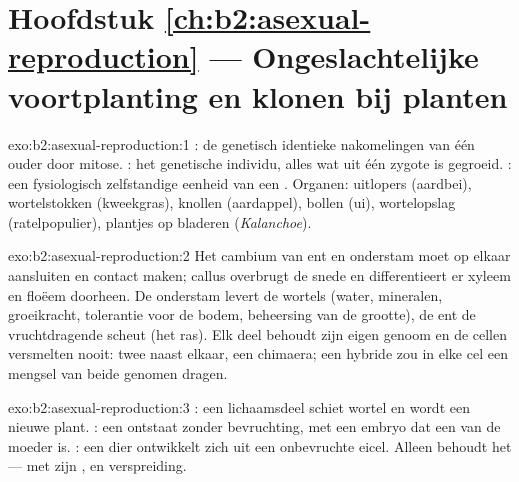 \section*{Hoofdstuk \ref{ch:b2:asexual-reproduction} --- Ongeslachtelijke voortplanting en klonen bij planten}

\begin{solution}{exo:b2:asexual-reproduction:1}
: de genetisch identieke nakomelingen van één ouder door mitose.
: het genetische individu, alles wat uit één zygote is gegroeid.
: een fysiologisch zelfstandige eenheid van een . Organen:
uitlopers (aardbei), wortelstokken (kweekgras), knollen (aardappel), bollen
(ui), wortelopslag (ratelpopulier), plantjes op bladeren
(\emph{Kalanchoe}).
\end{solution}

\begin{solution}{exo:b2:asexual-reproduction:2}
Het cambium van ent en onderstam moet op elkaar aansluiten en contact
maken; callus overbrugt de snede en differentieert er xyleem en floëem
doorheen. De onderstam levert de wortels (water, mineralen, groeikracht,
tolerantie voor de bodem, beheersing van de grootte), de ent de
vruchtdragende scheut (het ras). Elk deel behoudt zijn eigen genoom en de
cellen versmelten nooit: twee  naast elkaar, een chimaera; een
hybride zou in elke cel een mengsel van beide genomen dragen.
\end{solution}

\begin{solution}{exo:b2:asexual-reproduction:3}
: een lichaamsdeel schiet wortel en wordt een
nieuwe plant. : een  ontstaat zonder bevruchting, met een
embryo dat een  van de moeder is. : een dier ontwikkelt
zich uit een onbevruchte eicel. Alleen  behoudt het  --- met
zijn ,  en verspreiding.
\end{solution}

